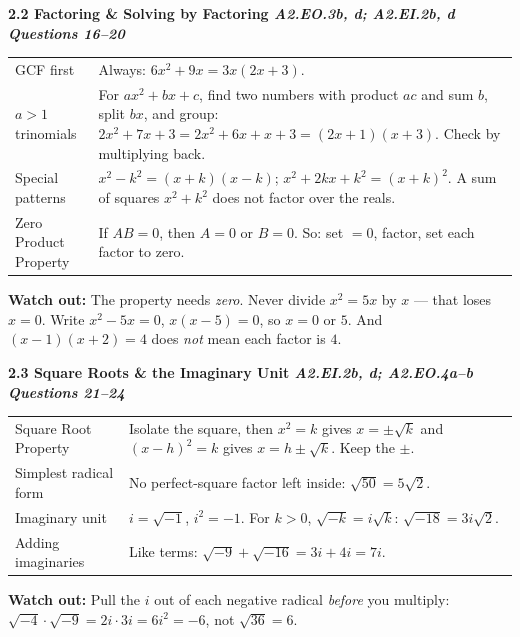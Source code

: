 \documentclass[10pt]{article}
\newcommand{\sghead}[2]{%
  \boxguard[10]%
  \vspace{4pt}\par\noindent
  \colorbox{forest}{\parbox{\dimexpr\linewidth-2\fboxsep}{%
    \small\color{white}\bfseries #1 \hfill \textmd{\itshape\scriptsize\color{forestmid} #2}}}%
  \vspace{2pt}\par}
\newcommand{\sgwatch}[1]{%
  \vspace{1pt}\par\noindent
  \colorbox{redbg}{\parbox{\dimexpr\linewidth-2\fboxsep}{%
    \footnotesize\textbf{\textcolor{redacc}{Watch out:}} #1}}%
  \vspace{1pt}\par}
\newcommand{\sgtabsetup}{\renewcommand{\arraystretch}{1.06}\footnotesize}
\begin{document}
\sghead{2.2 \quad Factoring \& Solving by Factoring}{A2.EO.3b, d; A2.EI.2b, d \;\textbullet\; Questions 16--20}
{\sgtabsetup
\begin{tabularx}{\linewidth}{@{} G X @{}}
GCF first & Always: $6x^2+9x=3x(2x+3)$. \\
$a>1$ trinomials & For $ax^2+bx+c$, find two numbers with product $ac$ and sum $b$, split $bx$,
  and group: $2x^2+7x+3=2x^2+6x+x+3=(2x+1)(x+3)$. Check by multiplying back. \\
Special patterns & $x^2-k^2=(x+k)(x-k)$; $x^2+2kx+k^2=(x+k)^2$. A sum of squares $x^2+k^2$ does not
  factor over the reals. \\
Zero Product Property & If $AB=0$, then $A=0$ or $B=0$. So: set $=0$, factor, set each factor to
  zero. \\
\end{tabularx}}
\sgwatch{The property needs \emph{zero}. Never divide $x^2=5x$ by $x$ --- that loses $x=0$. Write
$x^2-5x=0$, $x(x-5)=0$, so $x=0$ or $5$. And $(x-1)(x+2)=4$ does \emph{not} mean each factor is
$4$.}

\sghead{2.3 \quad Square Roots \& the Imaginary Unit}{A2.EI.2b, d; A2.EO.4a--b \;\textbullet\; Questions 21--24}
{\sgtabsetup
\begin{tabularx}{\linewidth}{@{} G X @{}}
Square Root Property & Isolate the square, then $x^2=k$ gives $x=\pm\sqrt k$ and $(x-h)^2=k$ gives
  $x=h\pm\sqrt k$. Keep the $\pm$. \\
Simplest radical form & No perfect-square factor left inside: $\sqrt{50}=5\sqrt2$. \\
Imaginary unit & $i=\sqrt{-1}$, $i^2=-1$. For $k>0$, $\sqrt{-k}=i\sqrt k$:
  $\sqrt{-18}=3i\sqrt2$. \\
Adding imaginaries & Like terms: $\sqrt{-9}+\sqrt{-16}=3i+4i=7i$. \\
\end{tabularx}}
\sgwatch{Pull the $i$ out of each negative radical \emph{before} you multiply:
$\sqrt{-4}\cdot\sqrt{-9}=2i\cdot3i=6i^2=-6$, not $\sqrt{36}=6$.}
\end{document}
